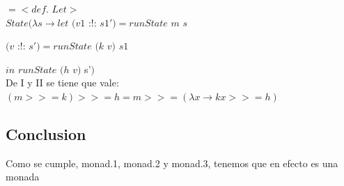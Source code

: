 \documentclass[12pt, titlepage]{article}
\begin{document}
$=<def.$ $Let>$\\
$State (\lambda s \rightarrow let$ $(v1$ :!: $s1') = runState$ $m$ $s$

\hspace{63pt}$(v$ :!: $s') = runState$ $(k$ $v)$ $s1$

\hspace{47pt}$in$ $runState$ $(h$ $v)$ s'$)$\\

\noindent De I y II se tiene que vale: $(m >>= k) >>= h = m >>= (\lambda x \rightarrow k x >>= h )$\

\subsection*{Conclusion}
Como se cumple, monad.1, monad.2 y monad.3, tenemos que en efecto es una monada
\end{document}
